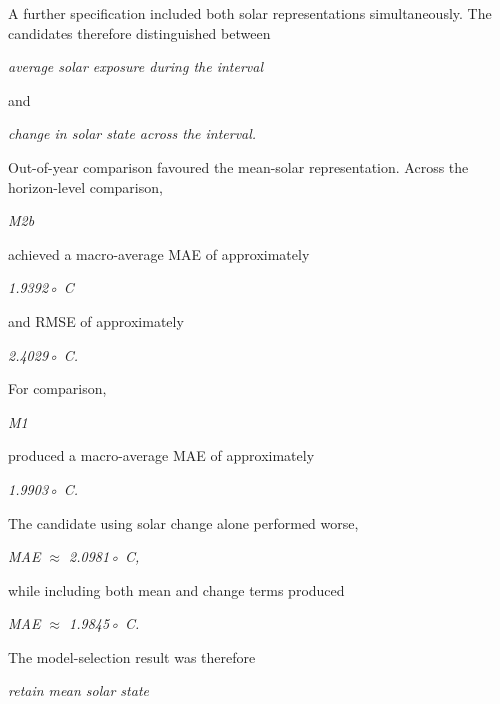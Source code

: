 A further specification included both solar representations simultaneously. The candidates therefore distinguished between

\begin{center}\textit{average solar exposure during the interval}\end{center}

and

\begin{center}\textit{change in solar state across the interval.}\end{center}

Out-of-year comparison favoured the mean-solar representation. Across the horizon-level comparison,

\begin{center}\textit{M2b}\end{center}

achieved a macro-average MAE of approximately

\begin{center}\textit{1.9392◦ C}\end{center}

and RMSE of approximately

\begin{center}\textit{2.4029◦ C.}\end{center}

For comparison,

\begin{center}\textit{M1}\end{center}

produced a macro-average MAE of approximately

\begin{center}\textit{1.9903◦ C.}\end{center}

The candidate using solar change alone performed worse,

\begin{center}\textit{MAE \ensuremath{\approx} 2.0981◦ C,}\end{center}

while including both mean and change terms produced

\begin{center}\textit{MAE \ensuremath{\approx} 1.9845◦ C.}\end{center}

The model-selection result was therefore

\begin{center}\textit{retain mean solar state}\end{center}

